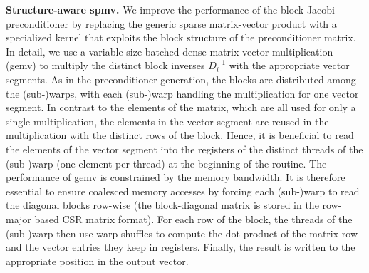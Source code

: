\vspace*{1ex}
\noindent
\textbf{Structure-aware  {\sc spmv}.}
We improve the performance of the block-Jacobi preconditioner by 
replacing the generic sparse matrix-vector product with a specialized kernel
that exploits the block structure of the preconditioner matrix.
In detail, we use a variable-size batched dense matrix-vector multiplication
({\sc gemv}) to multiply the distinct block inverses $D_i^{-1}$  
with the appropriate vector segments.
{As} in the preconditioner generation,
the blocks are distributed among the (sub-)warps,
with each (sub-)warp handling the multiplication for one vector segment.
In contrast to the elements of the matrix, which are all 
used for only a single multiplication,
the elements in the vector segment 
are reused in the multiplication with the distinct rows of the block.
Hence, it is beneficial to read the elements of the vector segment 
into the registers of the distinct threads of the (sub-)warp (one element per thread) 
at the beginning of the routine.
The performance of {{\sc gemv} is constrained} by the memory bandwidth.
It is therefore essential to ensure coalesced memory accesses
by forcing each (sub-)warp to read the diagonal blocks row-wise 
(the block-diagonal matrix is stored
in the row-major based CSR matrix format).
For each row of the block, the threads of the (sub-)warp then use
warp shuffles to compute the dot product of the matrix row and the 
vector entries they keep in registers.
Finally, the result is written to the appropriate position in the output vector.
